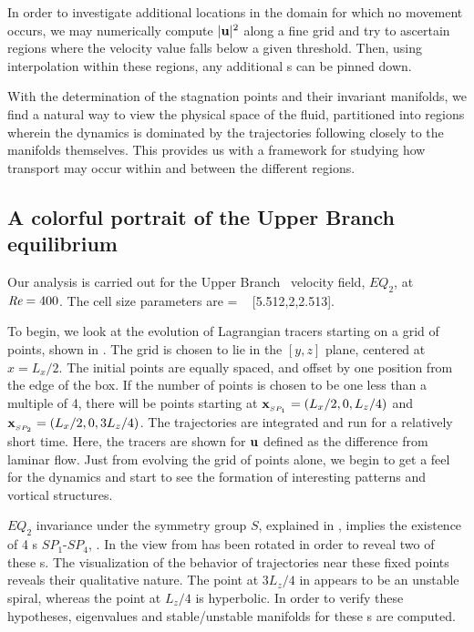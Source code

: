 \documentclass[letter,12pt,openany]{article}
\begin{document}
 In order to investigate additional locations in the domain for which no movement occurs, we may numerically compute $|{\bf u}|^{2}$ along a fine
grid and try to ascertain regions where the velocity value falls below a given threshold. Then,
using interpolation within these regions, any additional  \stagp s can be
pinned down. 

With the determination of the stagnation points and their invariant manifolds, we find a natural way to view the physical space of the fluid, partitioned into regions wherein the dynamics is dominated by the trajectories following closely to the manifolds themselves. This provides us with a framework for studying how transport may occur within and between the different regions.






\subsection{A colorful portrait of the Upper Branch equilibrium}
\label{sec:eq2}


Our analysis is carried out for the 
Upper Branch \eqv\ velocity field, $EQ_2$, at $\textit{Re} = 400$.
The cell size parameters are \beq   [L_x,2,L_z]
         = \; [2\pi/1.14,2,4\pi/5]
         ~ [5.512,2,2.513].
\label{cellW03}
\eeq

To begin, we look at the evolution of Lagrangian tracers starting on a grid of points, shown in . The grid
is chosen to lie in the $[y,z]$ plane, centered at $x = L_x/2$. The initial
points are equally spaced, and offset by one position from the edge
of the box. If the number of points is chosen to be one less than a
multiple of 4, there will be points starting at $\bold{x}_{_{SP_{1}}}=(L_x/2,0,L_z/4)$ and
$\bold{x}_{_{SP_{2}}}=(L_x/2,0,3L_z/4)$. The
trajectories are integrated and run for a relatively short time. Here, the tracers are shown for ${\bf u}$ defined as the difference from laminar flow. Just from evolving the grid of points alone, we begin to get a feel for the dynamics and start to see the formation of interesting patterns and vortical structures.




$EQ_2$ invariance under the symmetry group $S$, explained  in
, implies the existence of 4 \stagp s $SP_1$-$SP_4$,
.
In  the view
from  has been rotated in order
to reveal two of these \stagp s. The visualization of the behavior of trajectories near these
fixed points reveals their  qualitative nature.
The point at $3L_z/4$ in  appears to be an
unstable spiral, whereas the point at $L_z/4$ is hyperbolic. In order to verify these hypotheses, eigenvalues and
stable/unstable manifolds for these \stagp s are computed. \\
\end{document}

